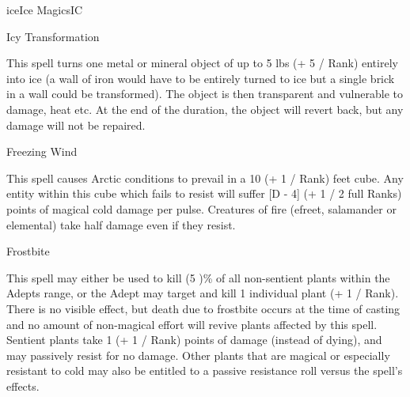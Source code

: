\begin{college}[1.5]{ice}{Ice Magics}{IC}
\begin{spell}[S-2]{Icy Transformation}

\begin{effects}
This spell turns one metal or mineral object of up to 5 lbs (+ 5 /
Rank) entirely into ice (a wall of iron would have to be entirely
turned to ice but a single brick in a wall could be transformed).  The
object is then transparent and vulnerable to damage, heat etc. At the
end of the duration, the object will revert back, but any damage will
not be repaired.
\end{effects}
\end{spell}

\begin{spell}[S-3]{Freezing Wind}

\begin{effects}
This spell causes Arctic conditions to prevail in a 10 (+ 1 / Rank)
feet cube. Any entity within this cube which fails to resist will
suffer [D - 4] (+ 1 / 2 full Ranks) points of magical cold damage per
pulse. Creatures of fire (efreet, salamander or elemental) take half
damage even if they resist.
\end{effects}
\end{spell}

\begin{spell}[S-4]{Frostbite}

\begin{effects}
This spell may either be used to kill (5 \x [Rank])\% of all
non-sentient plants within the Adepts range, or the Adept may target
and kill 1 individual plant (+ 1 / Rank).  There is no visible effect,
but death due to frostbite occurs at the time of casting and no amount
of non-magical effort will revive plants affected by this spell.
Sentient plants take 1 (+ 1 / Rank) points of damage (instead of
dying), and may passively resist for no damage.  Other plants that are
magical or especially resistant to cold may also be entitled to a
passive resistance roll versus the spell's effects.
\end{effects}
\end{spell}


\end{college}
